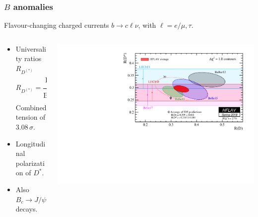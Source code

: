 \documentclass[mathserif, 10pt]{beamer}
\begin{document}
\begin{frame}
    \frametitle{$B$ anomalies}
    Flavour-changing charged currents $b\to c \ell \nu$, with $\ell = e/\mu, \tau$.
    \begin{columns}
        \begin{column}{0.55\textwidth}

            \begin{itemize}
                \item Universality ratios $R_{D^{(*)}}$
                      $$R_{D^{(*)}} = \frac{\mathrm{BR}(B\to D^{(*)}\tau \nu)}{\mathrm{BR}(B\to D^{(*)}\ell \nu)}\,, $$
                      Combined tension of $3.08\,\sigma$.\footnotemark[1]
                \item Longitudinal polarization of $D^*$.
                \item Also $B_c \to J/\psi \ell\nu$ decays.
            \end{itemize}

        \end{column}
        \begin{column}{0.5\textwidth}
            \includegraphics[width=\columnwidth]{figures/rdrds_spring2019.pdf}
        \end{column}
    \end{columns}
\end{frame}
\end{document}
